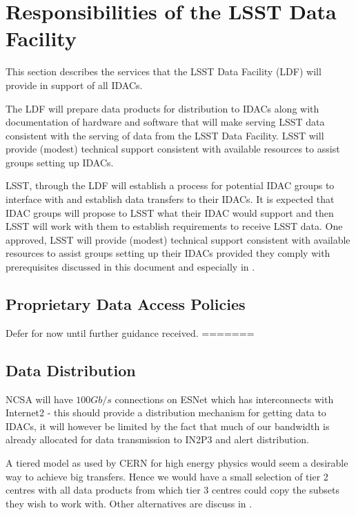 \section{Responsibilities of the LSST Data Facility}

This section describes the services that the LSST Data Facility (LDF) will provide in support of all  IDACs.

The LDF will prepare data products for distribution to IDACs along with documentation of hardware and software that will make serving LSST data consistent with the serving of data from the LSST Data Facility. LSST will provide (modest) technical support consistent with available resources to assist groups setting up IDACs.

LSST, through the LDF will establish a process for potential IDAC groups to interface with and establish data transfers to their IDACs. It is expected that IDAC groups will propose to LSST what their IDAC would support and then LSST will work with them to establish requirements to receive LSST data. One approved, LSST will provide (modest) technical support consistent with available resources to assist groups setting up their IDACs provided they comply with prerequisites discussed in this document and especially in .

\subsection{Proprietary Data Access Policies}
{\color{red}Defer for now until further guidance received.} \newline
=======

\subsection{Data Distribution} \label{sec:dist}

NCSA will have $100Gb/s$ connections  on ESNet which has interconnects with Internet2 - this should provide a distribution mechanism for getting data to IDACs, it will however be limited by the fact that much of our bandwidth is already allocated for data transmission to IN2P3 and alert distribution.

A tiered model as used by CERN for high energy physics would seem a desirable way to achieve big transfers. Hence we would have a small selection of tier 2 centres with all data products from which tier 3 centres could copy the subsets they wish to work with.  Other alternatives are discuss in .

